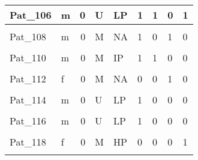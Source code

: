 \documentclass[11pt, a4paper, twosided]{book}
\begin{document}
\begin{longtable}[t]{l|l|r|l|l|l|l|l|l}
\hline
Pat\_106 & m & 0 & U & LP & 1 & 1 & 0 & 1\\
\hline
\cellcolor[HTML]{E2E868}{Pat\_107} & \cellcolor[HTML]{E2E868}{f} & \cellcolor[HTML]{E2E868}{0} & \cellcolor[HTML]{E2E868}{M} & \cellcolor[HTML]{E2E868}{NA} & \cellcolor[HTML]{E2E868}{1} & \cellcolor[HTML]{E2E868}{0} & \cellcolor[HTML]{E2E868}{0} & \cellcolor[HTML]{E2E868}{0}\\
\hline
Pat\_108 & m & 0 & M & NA & 1 & 0 & 1 & 0\\
\hline
\cellcolor[HTML]{E2E868}{Pat\_109} & \cellcolor[HTML]{E2E868}{m} & \cellcolor[HTML]{E2E868}{0} & \cellcolor[HTML]{E2E868}{M} & \cellcolor[HTML]{E2E868}{HP} & \cellcolor[HTML]{E2E868}{1} & \cellcolor[HTML]{E2E868}{0} & \cellcolor[HTML]{E2E868}{0} & \cellcolor[HTML]{E2E868}{0}\\
\hline
Pat\_110 & m & 0 & M & IP & 1 & 1 & 0 & 0\\
\hline
\cellcolor[HTML]{E2E868}{Pat\_111} & \cellcolor[HTML]{E2E868}{f} & \cellcolor[HTML]{E2E868}{1} & \cellcolor[HTML]{E2E868}{U} & \cellcolor[HTML]{E2E868}{LP} & \cellcolor[HTML]{E2E868}{1} & \cellcolor[HTML]{E2E868}{0} & \cellcolor[HTML]{E2E868}{0} & \cellcolor[HTML]{E2E868}{0}\\
\hline
Pat\_112 & f & 0 & M & NA & 0 & 0 & 1 & 0\\
\hline
\cellcolor[HTML]{E2E868}{Pat\_113} & \cellcolor[HTML]{E2E868}{f} & \cellcolor[HTML]{E2E868}{0} & \cellcolor[HTML]{E2E868}{M} & \cellcolor[HTML]{E2E868}{HP} & \cellcolor[HTML]{E2E868}{1} & \cellcolor[HTML]{E2E868}{0} & \cellcolor[HTML]{E2E868}{0} & \cellcolor[HTML]{E2E868}{0}\\
\hline
Pat\_114 & m & 0 & U & LP & 1 & 0 & 0 & 0\\
\hline
\cellcolor[HTML]{E2E868}{Pat\_115} & \cellcolor[HTML]{E2E868}{m} & \cellcolor[HTML]{E2E868}{1} & \cellcolor[HTML]{E2E868}{U} & \cellcolor[HTML]{E2E868}{LP} & \cellcolor[HTML]{E2E868}{1} & \cellcolor[HTML]{E2E868}{0} & \cellcolor[HTML]{E2E868}{0} & \cellcolor[HTML]{E2E868}{1}\\
\hline
Pat\_116 & m & 0 & U & LP & 1 & 0 & 0 & 0\\
\hline
\cellcolor[HTML]{E2E868}{Pat\_117} & \cellcolor[HTML]{E2E868}{m} & \cellcolor[HTML]{E2E868}{0} & \cellcolor[HTML]{E2E868}{U} & \cellcolor[HTML]{E2E868}{IP} & \cellcolor[HTML]{E2E868}{1} & \cellcolor[HTML]{E2E868}{0} & \cellcolor[HTML]{E2E868}{0} & \cellcolor[HTML]{E2E868}{0}\\
\hline
Pat\_118 & f & 0 & M & HP & 0 & 0 & 0 & 1\\
\hline
\cellcolor[HTML]{E2E868}{Pat\_119} & \cellcolor[HTML]{E2E868}{m} & \cellcolor[HTML]{E2E868}{0} & \cellcolor[HTML]{E2E868}{U} & \cellcolor[HTML]{E2E868}{LP} & \cellcolor[HTML]{E2E868}{NA} & \cellcolor[HTML]{E2E868}{NA} & \cellcolor[HTML]{E2E868}{NA} & \cellcolor[HTML]{E2E868}{NA}\\

\end{longtable}
\end{document}
